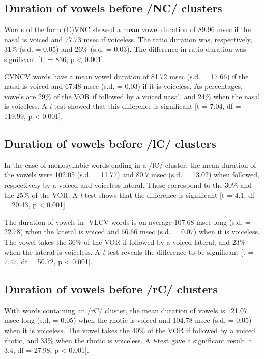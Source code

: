 \documentclass[11pt,a4paper,oneside,openany]{memoir}\usepackage[]{graphicx}\usepackage[]{color}
\begin{document}
\subsection{Duration of vowels before /NC/ clusters}


Words of the form (C)VNC showed a mean vowel duration of 89.96 msec if the nasal is voiced and 77.73 msec if voiceless.
The ratio duration was, respectively, 31\% (s.d. = 0.05) and 26\% (s.d. = 0.03).
The difference in ratio duration was significant [U = 836, p < 0.001].



CVNCV words have a mean vowel duration of 81.72 msec (s.d. = 17.66) if the nasal is voiced and 67.48 msec  (s.d. = 0.03) if it is voiceless.
As percentages, vowels are 29\% of the VOR if followed by a voiced nasal, and 24\% when the nasal is voiceless.
A \textit{t}-test showed that this difference is significant [t = 7.04, df = 119.99, p < 0.001].


\subsection{Duration of vowels before /lC/ clusters}


In the case of monosyllabic words ending in a /lC/ cluster, the mean duration of the vowels were 102.05 (s.d. = 11.77) and 80.7 msec (s.d. = 13.02) when followed, respectively by a voiced and voiceless lateral.
These correspond to the 30\% and the 25\% of the VOR.
A \textit{t}-test shows that the difference is significant [t = 4.1, df = 20.43, p < 0.001].




The duration of vowels in -VLCV words is on average 107.68 msec long (s.d. = 22.78) when the lateral is voiced and 66.66 msec (s.d. = 0.07) when it is voiceless.
The vowel takes the 36\% of the VOR if followed by a voiced lateral, and 23\% when the lateral is voiceless.
A \textit{t}-test reveals the difference to be significant [t = 7.47, df = 50.72, p < 0.001].

\subsection{Duration of vowels before /rC/ clusters}



With words containing an /rC/ cluster, the mean duration of vowels is 121.07 msec long (s.d. = 0.05) when the rhotic is voiced and 104.78 msec (s.d. = 0.05) when it is voiceless.
The vowel takes the 40\% of the VOR if followed by a voiced rhotic, and 33\% when the rhotic is voiceless.
A \textit{t}-test gave a significant result [t = 3.4, df = 27.98, p < 0.001].
\end{document}
